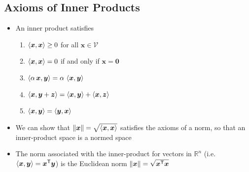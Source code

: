 \begin{slide}
\section[-1]{Axioms of Inner Products}

\begin{PauseHighLight}
  \begin{itemize}
  \item An inner product satisfies
      \begin{enumerate}\squeeze
      \item $\left\langle {\bm{x}}, {\bm{x}}\right\rangle \geq 0$ for all $\bm{x}\in\mathcal{V}$\pause
      \item $\left\langle {\bm{x}}, {\bm{x}}\right\rangle = 0$  if and only if $\bm{x}=\bm{0}$\pause
      \item $\left\langle {\alpha\, \bm{x}}, {\bm{y}}\right\rangle = \alpha\,
        \left\langle {\bm{x}}, {\bm{y}}\right\rangle$\pause
      \item $\left\langle {\bm{x}}, {\bm{y}+\bm{z}}\right\rangle = \left\langle {\bm{x}}, {\bm{y}}\right\rangle +
        \left\langle {\bm{x}}, {\bm{z}}\right\rangle$\pause
      \item $\left\langle {\bm{x}}, {\bm{y}}\right\rangle = \left\langle {\bm{y}}, {\bm{x}}\right\rangle$\pause
      \end{enumerate}
    \item We can show that $\| \bm{x} \| = \sqrt{\left\langle {\bm{x}}, {\bm{x}}\right\rangle}$
      satisfies the axioms of a norm, so that an inner-product space is
      a normed space\pause
    \item The norm associated with the inner-product for vectors in
      $\mathbb{R}^n$ (i.e. $ \langle \bm{x}, \bm{y} \rangle =
      \bm{x}^{\textsf{T}}\bm{y}$) is the Euclidean norm $\|\bm{x}\| = \sqrt{\bm{x}^{\textsf{T}}\bm{x}}$\pause
  \end{itemize}
\end{PauseHighLight}

\end{slide}


